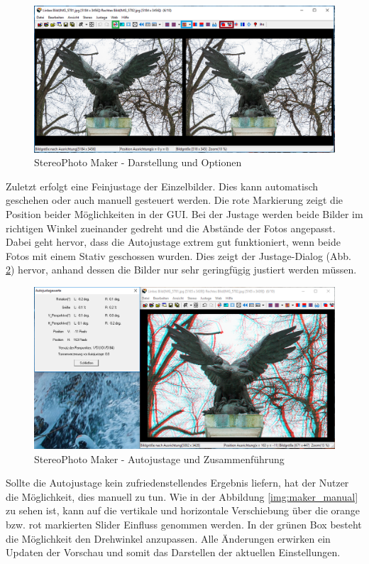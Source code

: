 \documentclass[liststotoc,bibtotoc,fontsize=14pt,]{scrreprt}
\begin{document}
		\begin{figure}[H]
			\includegraphics[width=\linewidth]{img/steps/step2.png}
			\caption{StereoPhoto Maker - Darstellung und Optionen}
			\label{img:maker_options}
		\end{figure}

		Zuletzt erfolgt eine Feinjustage der Einzelbilder. Dies kann automatisch geschehen oder auch manuell gesteuert werden. Die rote Markierung zeigt die Position beider Möglichkeiten in der GUI. Bei der Justage werden beide Bilder im richtigen Winkel zueinander gedreht und die Abstände der Fotos angepasst. Dabei geht hervor, dass die Autojustage extrem gut funktioniert, wenn beide Fotos mit einem Stativ geschossen wurden. Dies zeigt der Justage-Dialog (Abb. \ref{img:maker_justage}) hervor, anhand dessen die Bilder nur sehr geringfügig justiert werden müssen.
		
		\begin{figure}[H]
			\includegraphics[width=\linewidth]{img/steps/step3.png}
			\caption{StereoPhoto Maker - Autojustage und Zusammenführung}
			\label{img:maker_justage}
		\end{figure}
		
		Sollte die Autojustage kein zufriedenstellendes Ergebnis liefern, hat der Nutzer die Möglichkeit, dies manuell zu tun. Wie in der Abbildung \ref{img:maker_manual} zu sehen ist, kann auf die vertikale und horizontale Verschiebung über die orange bzw. rot markierten Slider Einfluss genommen werden. In der grünen Box besteht die Möglichkeit den Drehwinkel anzupassen. Alle Änderungen erwirken ein Updaten der Vorschau und somit das Darstellen der aktuellen Einstellungen.
		
\end{document}
